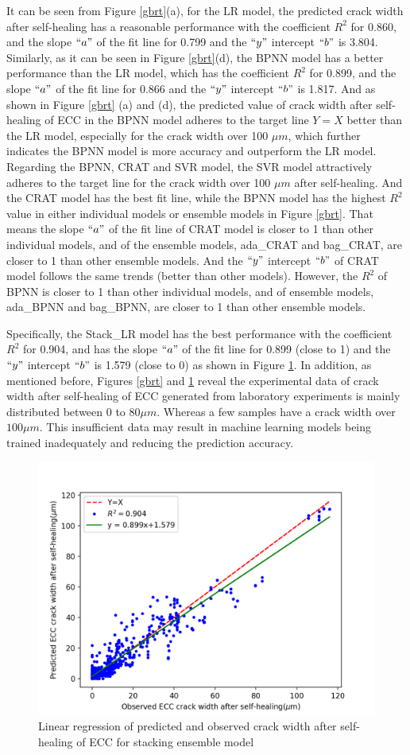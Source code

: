 \documentclass[11pt]{article}
\begin{document}
	
	It can be seen from Figure \ref{gbrt}(a), for the LR model, the predicted crack width after self-healing has a reasonable performance with the coefficient $R^2$ for 0.860, and the slope $``a"$ of the fit line for 0.799 and the $``y"$ intercept $``b"$ is 3.804. Similarly, as it can be seen in Figure \ref{gbrt}(d), the BPNN model has a better performance than the LR model, which has the coefficient $R^2$ for 0.899, and the slope $``a"$ of the fit line for 0.866 and the $``y"$ intercept $``b"$ is 1.817. And as shown in Figure \ref{gbrt} (a) and (d), the predicted value of crack width after self-healing of ECC in the BPNN model adheres to the target line $Y = X$ better than the LR model, especially for the crack width over 100 $\mu m$, which further indicates the BPNN model is more accuracy and outperform the LR model. Regarding the BPNN, CRAT and SVR model, the SVR model attractively adheres to the target line for the crack width over 100 $\mu m$ after self-healing. And the CRAT model has the best fit line, while the BPNN model has the highest $R^2$ value in either individual models or ensemble models in Figure \ref{gbrt}. That means the slope $``a"$ of the fit line of CRAT model is closer to 1 than other individual models, and of the ensemble models, ada\_CRAT and bag\_CRAT, are closer to 1 than other ensemble models. And the $``y"$ intercept $``b"$ of CRAT model follows the same trends (better than other models). However, the $R^2$ of BPNN is closer to 1 than other individual models, and of ensemble models, ada\_BPNN and bag\_BPNN, are closer to 1 than other ensemble models.  
	
	Specifically, the Stack\_LR model has the best performance with the coefficient $R^2$ for 0.904, and has the slope $``a"$ of the fit line for 0.899 (close to 1) and the $``y"$ intercept $``b"$ is 1.579 (close to 0) as shown in Figure \ref{fig:st}. In addition, as mentioned before, Figures \ref{gbrt} and \ref{fig:st} reveal the experimental data of crack width after self-healing of ECC generated from laboratory experiments is mainly distributed between $0$ to $80 \mu m$. Whereas a few samples have a crack width over $100 \mu m$. This insufficient data may result in machine learning models being trained inadequately and reducing the prediction accuracy.  
	
		\begin{figure}[!h]
	    \centering
	    \includegraphics[width = 0.5\linewidth]{02Stack_LR.png}
	    \caption{Linear regression of predicted and observed crack width after self-healing of ECC for stacking ensemble model}
	    \label{fig:st}
	\end{figure}
	
\end{document}
